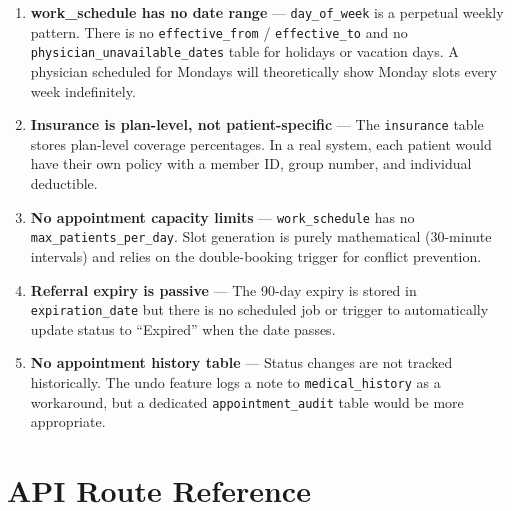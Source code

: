 \documentclass[12pt, letterpaper]{article}
\begin{document}
\begin{alertbox}
\begin{enumerate}
  \item \textbf{work\_schedule has no date range} — \texttt{day\_of\_week} is a perpetual weekly pattern. There is no \texttt{effective\_from} / \texttt{effective\_to} and no \texttt{physician\_unavailable\_dates} table for holidays or vacation days. A physician scheduled for Mondays will theoretically show Monday slots every week indefinitely.
  \item \textbf{Insurance is plan-level, not patient-specific} — The \texttt{insurance} table stores plan-level coverage percentages. In a real system, each patient would have their own policy with a member ID, group number, and individual deductible.
  \item \textbf{No appointment capacity limits} — \texttt{work\_schedule} has no \texttt{max\_patients\_per\_day}. Slot generation is purely mathematical (30-minute intervals) and relies on the double-booking trigger for conflict prevention.
  \item \textbf{Referral expiry is passive} — The 90-day expiry is stored in \texttt{expiration\_date} but there is no scheduled job or trigger to automatically update status to ``Expired'' when the date passes.
  \item \textbf{No appointment history table} — Status changes are not tracked historically. The undo feature logs a note to \texttt{medical\_history} as a workaround, but a dedicated \texttt{appointment\_audit} table would be more appropriate.
\end{enumerate}
\end{alertbox}

\section{API Route Reference}
\end{document}
